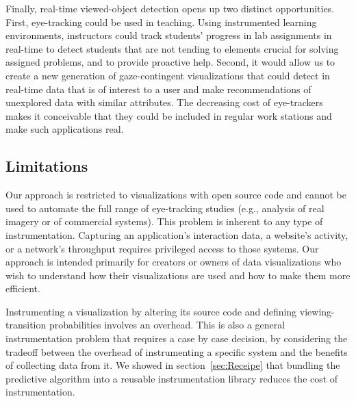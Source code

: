 Finally, real-time viewed-object detection opens up two distinct opportunities. First, eye-tracking could be used in teaching. Using instrumented learning environments, instructors could track students' progress in lab assignments in real-time to detect students that are not tending to elements crucial for solving assigned problems, and to provide proactive help. Second, it would allow us to create a new generation of gaze-contingent visualizations that could detect in real-time data that is of interest to a user and make recommendations of unexplored data with similar attributes. The decreasing cost of eye-trackers makes it conceivable that they could be included in regular work stations and make such applications real.

\subsection{Limitations}
\label{sec:Limitations}
Our approach is restricted to visualizations with open source code and cannot be used to automate the full range of eye-tracking studies (e.g., analysis of real imagery or of commercial systems).   This problem is inherent to any type of instrumentation. Capturing an application's interaction data, a website's activity, or a network's throughput requires privileged access to those systems. Our approach is intended primarily for creators or owners of data visualizations who wish to understand how their visualizations are used and how to make them more efficient. 

Instrumenting a visualization by altering its source code and defining viewing-transition probabilities involves an overhead. This is also a general instrumentation problem that requires a case by case decision, by considering the tradeoff between the overhead of instrumenting a specific system and the benefits of collecting data from it. We showed in section~\ref{sec:Receipe} that bundling the predictive algorithm into a reusable instrumentation library reduces the cost of instrumentation.    

